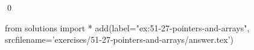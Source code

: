 
\begin{ex}
  \label{ex:51-27-pointers-and-arrays}
  
  \qed
\end{ex}
\begin{python0}
from solutions import *
add(label="ex:51-27-pointers-and-arrays",
    srcfilename='exercises/51-27-pointers-and-arrays/answer.tex')
\end{python0}
